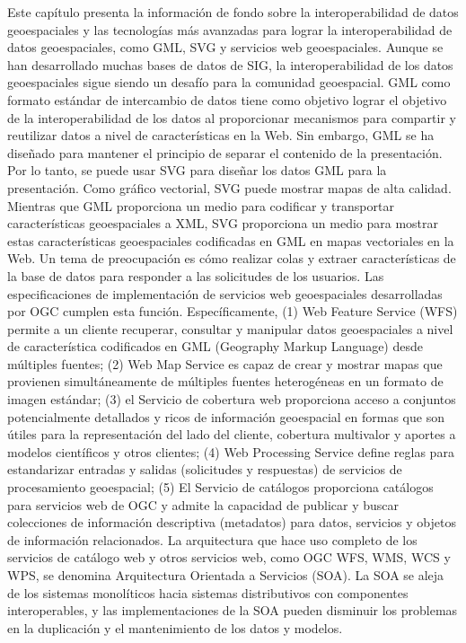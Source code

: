 Este capítulo presenta la información de fondo sobre la interoperabilidad de datos geoespaciales y las tecnologías más avanzadas para lograr la interoperabilidad de datos geoespaciales, como GML, SVG y servicios web geoespaciales. Aunque se han desarrollado muchas bases de datos de SIG, la interoperabilidad de los datos geoespaciales sigue siendo un desafío para la comunidad geoespacial. GML como formato estándar de intercambio de datos tiene como objetivo lograr el objetivo de la interoperabilidad de los datos al proporcionar mecanismos para compartir y reutilizar datos a nivel de características en la Web. Sin embargo, GML se ha diseñado para mantener el principio de separar el contenido de la presentación. Por lo tanto, se puede usar SVG para diseñar los datos GML para la presentación. Como gráfico vectorial, SVG puede mostrar mapas de alta calidad. Mientras que GML proporciona un medio para codificar y transportar características geoespaciales a XML, SVG proporciona un medio para mostrar estas características geoespaciales codificadas en GML en mapas vectoriales en la Web. Un tema de preocupación es cómo realizar colas y extraer características de la base de datos para responder a las solicitudes de los usuarios. Las especificaciones de implementación de servicios web geoespaciales desarrolladas por OGC cumplen esta función. Específicamente, (1) Web Feature Service (WFS) permite a un cliente recuperar, consultar y manipular datos geoespaciales a nivel de característica codificados en GML (Geography Markup Language) desde múltiples fuentes; (2) Web Map Service es capaz de crear y mostrar mapas que provienen simultáneamente de múltiples fuentes heterogéneas en un formato de imagen estándar; (3) el Servicio de cobertura web proporciona acceso a conjuntos potencialmente detallados y ricos de información geoespacial en formas que son útiles para la representación del lado del cliente, cobertura multivalor y aportes a modelos científicos y otros clientes; (4) Web Processing Service define reglas para estandarizar entradas y salidas (solicitudes y respuestas) de servicios de procesamiento geoespacial; (5) El Servicio de catálogos proporciona catálogos para servicios web de OGC y admite la capacidad de publicar y buscar colecciones de información descriptiva (metadatos) para datos, servicios y objetos de información relacionados. La arquitectura que hace uso completo de los servicios de catálogo web y otros servicios web, como OGC WFS, WMS, WCS y WPS, se denomina Arquitectura Orientada a Servicios (SOA). La SOA se aleja de los sistemas monolíticos hacia sistemas distributivos con componentes interoperables, y las implementaciones de la SOA pueden disminuir los problemas en la duplicación y el mantenimiento de los datos y modelos.

